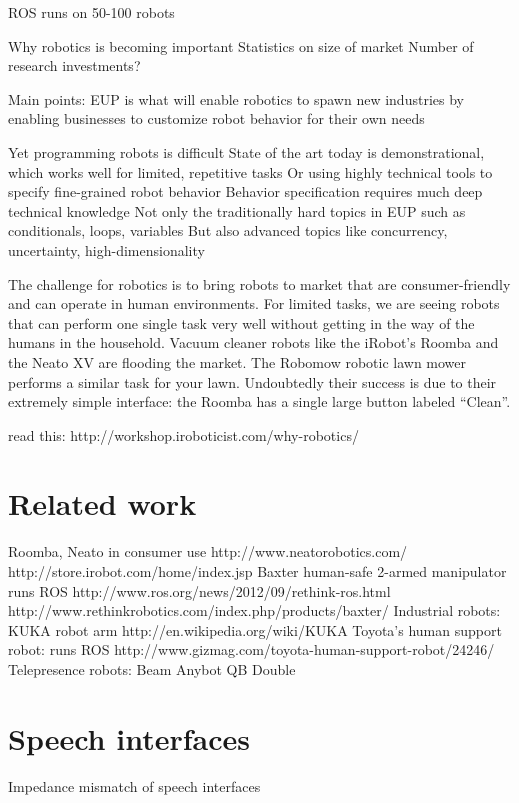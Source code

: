 \documentclass{article}
\begin{document}
ROS runs on 50-100 robots



















Why robotics is becoming important
Statistics on size of market
Number of research investments?

Main points:
	EUP is what will enable robotics to spawn new industries
	by enabling businesses to customize robot behavior for their own needs

	Yet programming robots is difficult
	State of the art today is demonstrational, which works well for limited, repetitive tasks
	Or using highly technical tools to specify fine-grained robot behavior
	Behavior specification requires much deep technical knowledge
	Not only the traditionally hard topics in EUP such as conditionals, loops, variables
	But also advanced topics like concurrency, uncertainty, high-dimensionality

The challenge for robotics is to bring robots to market that are consumer-friendly and can operate in human environments. For limited tasks, we are seeing robots that can perform one single task very well without getting in the way of the humans in the household. Vacuum cleaner robots like the iRobot's Roomba and the Neato XV are flooding the market. The Robomow robotic lawn mower performs a similar task for your lawn. Undoubtedly their success is due to their extremely simple interface: the Roomba has a single large button labeled ``Clean''.


read this: http://workshop.iroboticist.com/why-robotics/

\section{Related work}

Roomba, Neato in consumer use
	http://www.neatorobotics.com/
	http://store.irobot.com/home/index.jsp
Baxter human-safe 2-armed manipulator
	runs ROS
	http://www.ros.org/news/2012/09/rethink-ros.html
	http://www.rethinkrobotics.com/index.php/products/baxter/
Industrial robots:
	KUKA robot arm http://en.wikipedia.org/wiki/KUKA
Toyota's human support robot:
	runs ROS
	http://www.gizmag.com/toyota-human-support-robot/24246/
Telepresence robots:
	Beam
	Anybot QB
	Double


\section{Speech interfaces}

Impedance mismatch of speech interfaces



\end{document}
